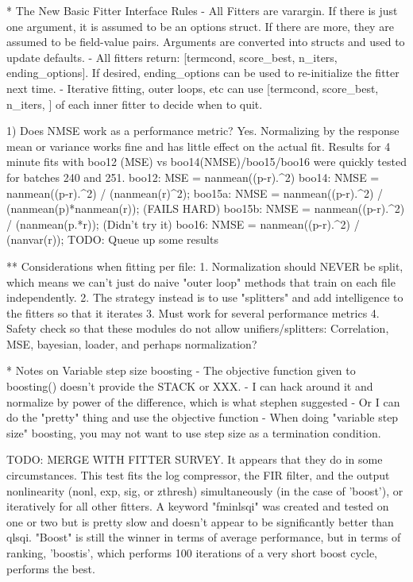 * The New Basic Fitter Interface Rules
  - All Fitters are varargin. If there is just one argument, it is assumed to be an options struct. If there are more, they are assumed to be field-value pairs. Arguments are converted into structs and used to update defaults. 
  - All fitters return: [termcond, score_best, n_iters, ending_options]. If desired, ending_options can be used to re-initialize the fitter next time. 
  - Iterative fitting, outer loops, etc can use [termcond, score_best, n_iters, ] of each inner fitter to decide when to quit. 


 1) Does NMSE work as a performance metric?
     Yes. Normalizing by the response mean or variance works fine and has little effect on the actual fit. 
     Results for 4 minute fits with boo12 (MSE) vs boo14(NMSE)/boo15/boo16 were quickly tested for batches 240 and 251. 
     boo12: MSE  = nanmean((p-r).^2)
     boo14: NMSE = nanmean((p-r).^2) / (nanmean(r)^2);
     boo15a: NMSE = nanmean((p-r).^2) / (nanmean(p)*nanmean(r));  (FAILS HARD)
     boo15b: NMSE = nanmean((p-r).^2) / (nanmean(p.*r));  (Didn't try it)
     boo16: NMSE = nanmean((p-r).^2) / (nanvar(r));
     TODO: Queue up some results

** Considerations when fitting per file:
   1. Normalization should NEVER be split, which means we can't just do naive "outer loop" methods that train on each file independently. 
   2. The strategy instead is to use "splitters" and add intelligence to the fitters so that it iterates 
   3. Must work for several performance metrics
   4. Safety check so that these modules do not allow unifiers/splitters: Correlation, MSE, bayesian, loader, and perhaps normalization?


* Notes on Variable step size boosting
  - The objective function given to boosting() doesn't provide the STACK or XXX.
    - I can hack around it and normalize by power of the difference, which is what stephen suggested
    - Or I can do the "pretty" thing and use the objective function
  - When doing "variable step size" boosting, you may not want to use step size as a termination condition.




TODO: MERGE WITH FITTER SURVEY. It appears that they do in some circumstances. This test fits the log compressor, the FIR filter, and the output nonlinearity (nonl, exp, sig, or zthresh) simultaneously (in the case of 'boost'), or iteratively for all other fitters. A keyword "fminlsqi" was created and tested on one or two but is pretty slow and doesn't appear to be significantly better than qlsqi. "Boost" is still the winner in terms of average performance, but in terms of ranking, 'boostis', which performs 100 iterations of a very short boost cycle, performs the best.


